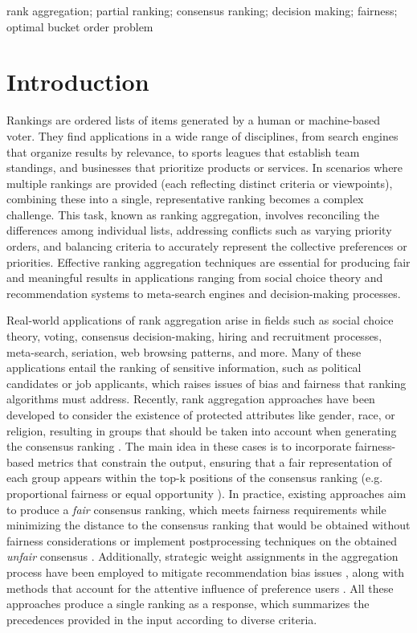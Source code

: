 \documentclass[preprint,12pt]{article}
\theoremstyle{definition}
\theoremstyle{remark}
\theoremstyle{example} %
\begin{document}
 rank aggregation; partial ranking; consensus ranking; decision making; fairness;  optimal bucket order problem %



\section{Introduction}\label{sec:intro}

 Rankings are ordered lists of items generated by a human or machine-based voter. They find applications in a wide range of disciplines, from search engines that organize results by relevance, to sports leagues that establish team standings, and businesses that prioritize products or services. 
In scenarios where multiple rankings are provided (each reflecting distinct criteria or viewpoints), combining these into a single, representative ranking becomes a complex challenge. This task, known as ranking aggregation, involves reconciling the differences among individual lists, addressing conflicts such as varying priority orders, and balancing criteria to accurately represent the collective preferences or priorities. Effective ranking aggregation techniques are essential for producing fair and meaningful results in applications ranging from social choice theory and recommendation systems to meta-search engines and decision-making processes.

Real-world applications of rank aggregation arise in fields such as social choice theory, voting, consensus decision-making, hiring and recruitment processes, meta-search, seriation, web browsing patterns, and more. Many of these applications entail the ranking of sensitive information, such as political candidates or job applicants, which raises issues of bias and fairness that ranking algorithms must address. Recently, rank aggregation approaches have been developed to consider the existence of protected attributes like gender, race, or religion, resulting in groups that should be taken into account when generating the consensus ranking \cite{FairRAP:2024,FairnesRanking:2021}. The main idea in these cases is to incorporate fairness-based metrics that constrain the output, ensuring that a fair representation of each group appears within the top-k positions of the consensus ranking (e.g. proportional fairness \cite{Baruah:1996} or equal opportunity \cite{Hardt:2016}). In practice, existing approaches aim to produce a {\em fair} consensus ranking, which meets fairness requirements while minimizing the distance  to the consensus ranking that would be obtained without fairness considerations \cite{Balestra2024,Kuhlman:2020}  or implement postprocessing techniques on the obtained {\em unfair} consensus \cite{Gorantla:2021}. Additionally, strategic weight assignments in the aggregation process have been employed to mitigate recommendation bias issues \cite{DONG2019}, along with methods that account for the attentive influence of preference users \cite{Yu2023}. All these approaches produce a single ranking as a response, which summarizes the precedences provided in the input according to diverse criteria.
\end{document}
